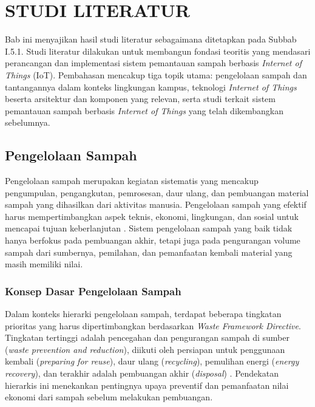 \cleardoublepage
\chapter{STUDI LITERATUR}
\label{chap:studi-literatur}

Bab ini menyajikan hasil studi literatur sebagaimana ditetapkan pada Subbab I.5.1. Studi literatur dilakukan untuk membangun fondasi teoritis yang mendasari perancangan dan implementasi sistem pemantauan sampah berbasis \textit{Internet of Things} (IoT). Pembahasan mencakup tiga topik utama: pengelolaan sampah dan tantangannya dalam konteks lingkungan kampus, teknologi \textit{Internet of Things} beserta arsitektur dan komponen yang relevan, serta studi terkait sistem pemantauan sampah berbasis \textit{Internet of Things} yang telah dikembangkan sebelumnya.

\section{Pengelolaan Sampah}

Pengelolaan sampah merupakan kegiatan sistematis yang mencakup pengumpulan, pengangkutan, pemrosesan, daur ulang, dan pembuangan material sampah yang dihasilkan dari aktivitas manusia. Pengelolaan sampah yang efektif harus mempertimbangkan aspek teknis, ekonomi, lingkungan, dan sosial untuk mencapai tujuan keberlanjutan \autocite{giurea2024}. Sistem pengelolaan sampah yang baik tidak hanya berfokus pada pembuangan akhir, tetapi juga pada pengurangan volume sampah dari sumbernya, pemilahan, dan pemanfaatan kembali material yang masih memiliki nilai.

\subsection{Konsep Dasar Pengelolaan Sampah}

Dalam konteks hierarki pengelolaan sampah, terdapat beberapa tingkatan prioritas yang harus dipertimbangkan berdasarkan \textit{Waste Framework Directive}. Tingkatan tertinggi adalah pencegahan dan pengurangan sampah di sumber (\textit{waste prevention and reduction}), diikuti oleh persiapan untuk penggunaan kembali (\textit{preparing for reuse}), daur ulang (\textit{recycling}), pemulihan energi (\textit{energy recovery}), dan terakhir adalah pembuangan akhir (\textit{disposal}) \autocite{ec2008}. Pendekatan hierarkis ini menekankan pentingnya upaya preventif dan pemanfaatan nilai ekonomi dari sampah sebelum melakukan pembuangan.

